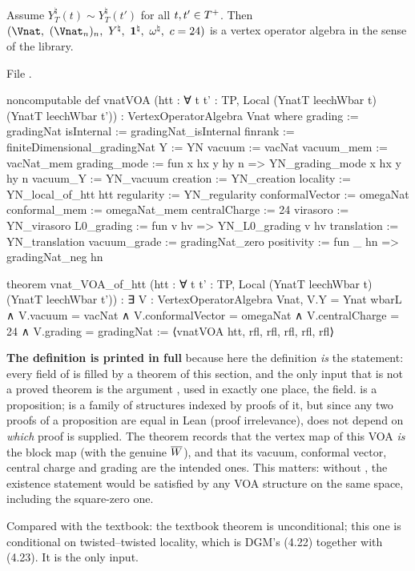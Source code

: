 \begin{theorem}\label{ch10:thm:vnatVOA}
Assume $Y^\natural_T(t)\sim Y^\natural_T(t')$ for all $t,t'\in T^{+}$.  Then
$(\Vnat,\ (\Vnat_n)_n,\ Y^\natural,\ \mathbf1^\natural,\ \omega^\natural,\ c=24)$ is a vertex
operator algebra in the sense of the library.
\end{theorem}
\noindent File .
\begin{leancode}
noncomputable def vnatVOA (htt : ∀ t t' : TP, Local (YnatT leechWbar t) (YnatT leechWbar t')) :
    VertexOperatorAlgebra Vnat where
  grading := gradingNat
  isInternal := gradingNat_isInternal
  finrank := finiteDimensional_gradingNat
  Y := YN
  vacuum := vacNat
  vacuum_mem := vacNat_mem
  grading_mode := fun x hx y hy n => YN_grading_mode x hx y hy n
  vacuum_Y := YN_vacuum
  creation := YN_creation
  locality := YN_local_of_htt htt
  regularity := YN_regularity
  conformalVector := omegaNat
  conformal_mem := omegaNat_mem
  centralCharge := 24
  virasoro := YN_virasoro
  L0_grading := fun v hv => YN_L0_grading v hv
  translation := YN_translation
  vacuum_grade := gradingNat_zero
  positivity := fun _ hn => gradingNat_neg hn

theorem vnat_VOA_of_htt (htt : ∀ t t' : TP, Local (YnatT leechWbar t) (YnatT leechWbar t')) :
    ∃ V : VertexOperatorAlgebra Vnat,
      V.Y = Ynat wbarL ∧ V.vacuum = vacNat ∧ V.conformalVector = omegaNat ∧
        V.centralCharge = 24 ∧ V.grading = gradingNat :=
  ⟨vnatVOA htt, rfl, rfl, rfl, rfl, rfl⟩
\end{leancode}
\begin{dictionary}
\textbf{The definition is printed in full} because here the definition \emph{is} the statement:
every field of  is filled by a theorem of this section, and the only
input that is not a proved theorem is the argument , used in exactly one place, the
 field.   is a proposition;  is a family of structures
indexed by proofs of it, but since any two proofs of a proposition are equal in Lean (proof
irrelevance),  does not depend on \emph{which} proof is supplied.  The theorem
 records that the vertex map of this VOA \emph{is} the block map
 (with the genuine $\overline{W}$), and that its vacuum, conformal vector, central
charge and grading are the intended ones.  This matters: without , the
existence statement would be satisfied by any VOA structure on the same space, including the
square-zero one.

Compared with the textbook: the textbook theorem is unconditional; this one is conditional on
twisted--twisted locality, which is DGM's (4.22) together with (4.23).  It is the only input.
\end{dictionary}

